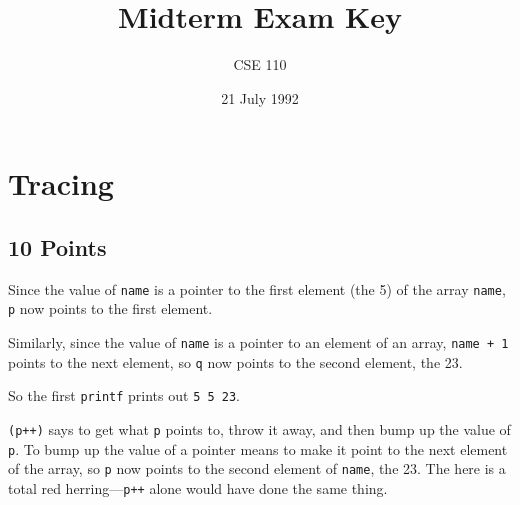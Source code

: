


\def\brac#1{$<$#1$>$}
\def\Int{{\tt int}}
\def\int{\brac{\Int}}
\def\int{\brac{\Int}}
\def\Shortint{{\tt short~int}}
\def\shortint{\brac{\Shortint}}
\def\Longint{{\tt long~int}}
\def\longint{\brac{\Longint}}
\def\Float{{\tt float}}
\def\float{\brac{\Float}}
\def\Double{{\tt double}}
\def\double{\brac{\Double}}
\def\Char{{\tt char}}
\def\chr{\brac{\Char}}
\def\Void{{\tt void}}
\def\void{\brac{\Void}}

\def\ptr#1{pointer~to #1}
\def\p2#1{\brac{\ptr#1}}
\def\Ano#1#2{array~of {#1}~#2s}
\def\ano#1#2{\brac{\Ano#1#2}}
\def\Ao#1{array~of #1}
\def\ao#1{\brac{\Ao#1}}

\def\breakhere{\mbox{$\otimes$}}
\parskip 8pt


\topmargin -0.5in
\textheight 9in


\title{Midterm Exam Key}
\author{CSE 110}
\date{21 July 1992}



\maketitle

\section{Tracing}

\subsection{10 Points}

Since the value of {\tt name} is a pointer to the first element (the 5)
of the array {\tt name}, {\tt p} now points to the first element.

Similarly, since the value of {\tt name} is a pointer to an element of
an array, \mbox{\tt name + 1} points to the next element, so {\tt q} now
points to the second element, the 23.

So the first {\tt printf} prints out {\tt 5 5 23}.

{\tt *(p++)} says to get what {\tt p} points to, throw it away, and then
bump up the value of {\tt p}.  To bump up the value of a pointer means
to make it point to the next element of the array, so {\tt p} now points
to the second element of {\tt name}, the 23.  The {\tt *} here is a
total red herring---{\tt p++} alone would have done the same thing.

